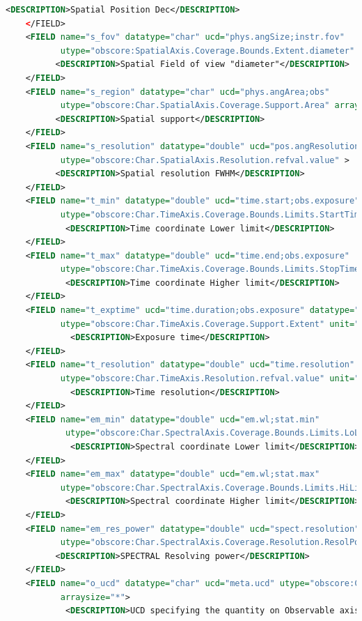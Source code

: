 \documentclass[11pt,a4paper]{ivoa}
\begin{document}
\begin{lstlisting}[basicstyle=\scriptsize,language=XML]
        <DESCRIPTION>Spatial Position Dec</DESCRIPTION> 
    </FIELD> 
    <FIELD name="s_fov" datatype="char" ucd="phys.angSize;instr.fov"
           utype="obscore:SpatialAxis.Coverage.Bounds.Extent.diameter" unit="deg" > 
          <DESCRIPTION>Spatial Field of view "diameter"</DESCRIPTION>
    </FIELD> 
    <FIELD name="s_region" datatype="char" ucd="phys.angArea;obs"
           utype="obscore:Char.SpatialAxis.Coverage.Support.Area" arraysize="*" unit="deg" > 
          <DESCRIPTION>Spatial support</DESCRIPTION>       
    </FIELD> 
    <FIELD name="s_resolution" datatype="double" ucd="pos.angResolution"
           utype="obscore:Char.SpatialAxis.Resolution.refval.value" > 
          <DESCRIPTION>Spatial resolution FWHM</DESCRIPTION>  
    </FIELD> 
    <FIELD name="t_min" datatype="double" ucd="time.start;obs.exposure"
           utype="obscore:Char.TimeAxis.Coverage.Bounds.Limits.StartTime" unit="s" > 
            <DESCRIPTION>Time coordinate Lower limit</DESCRIPTION>
    </FIELD> 
    <FIELD name="t_max" datatype="double" ucd="time.end;obs.exposure"
           utype="obscore:Char.TimeAxis.Coverage.Bounds.Limits.StopTime" unit="s"> 
            <DESCRIPTION>Time coordinate Higher limit</DESCRIPTION>
    </FIELD> 
    <FIELD name="t_exptime" ucd="time.duration;obs.exposure" datatype="double"
           utype="obscore:Char.TimeAxis.Coverage.Support.Extent" unit="s" > 
             <DESCRIPTION>Exposure time</DESCRIPTION>
    </FIELD> 
    <FIELD name="t_resolution" datatype="double" ucd="time.resolution"
           utype="obscore:Char.TimeAxis.Resolution.refval.value" unit="s" > 
             <DESCRIPTION>Time resolution</DESCRIPTION>
    </FIELD> 
    <FIELD name="em_min" datatype="double" ucd="em.wl;stat.min"
            utype="obscore:Char.SpectralAxis.Coverage.Bounds.Limits.LoLimit" unit="m" > 
             <DESCRIPTION>Spectral coordinate Lower limit</DESCRIPTION>
    </FIELD> 
    <FIELD name="em_max" datatype="double" ucd="em.wl;stat.max"
           utype="obscore:Char.SpectralAxis.Coverage.Bounds.Limits.HiLimit"  unit="m"> 
            <DESCRIPTION>Spectral coordinate Higher limit</DESCRIPTION>
    </FIELD> 
    <FIELD name="em_res_power" datatype="double" ucd="spect.resolution"
           utype="obscore:Char.SpectralAxis.Coverage.Resolution.ResolPower.refval" > 
          <DESCRIPTION>SPECTRAL Resolving power</DESCRIPTION>
    </FIELD> 
    <FIELD name="o_ucd" datatype="char" ucd="meta.ucd" utype="obscore:Char.ObservableAxis.ucd" 
           arraysize="*"> 
            <DESCRIPTION>UCD specifying the quantity on Observable axis</DESCRIPTION>

\end{lstlisting}
\end{document}
